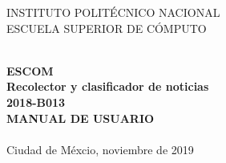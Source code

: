 
\thispagestyle{plainPortada}


\begin{minipage}[b]{.1\textwidth}
\end{minipage}
\begin{minipage}{.8\textwidth}

  \begin{center}

        \large{INSTITUTO} \large{POLITÉCNICO} \large{NACIONAL}\\
        \large{ESCUELA} \large{SUPERIOR} \large{DE} \large{CÓMPUTO}\\

  \end{center}





\end{minipage}
\begin{minipage}[b]{.1\textwidth}
\end{minipage}

\begin{center}


\ \\[1cm]

\textbf{ \LARGE{ESCOM}}\\[1cm]

  \textbf{ \LARGE{R}\LARGE{ecolector} \LARGE{y} \LARGE{clasificador} \LARGE{de}  
  \LARGE{noticias}}\\[1cm]
  
  \large{\textbf{2018-B013}}\\[1cm]

  \textbf{ \LARGE{MANUAL DE USUARIO}}\\[1cm]


     \ \\[5cm]
     Ciudad de Méxcio, noviembre de 2019
  

\end{center}